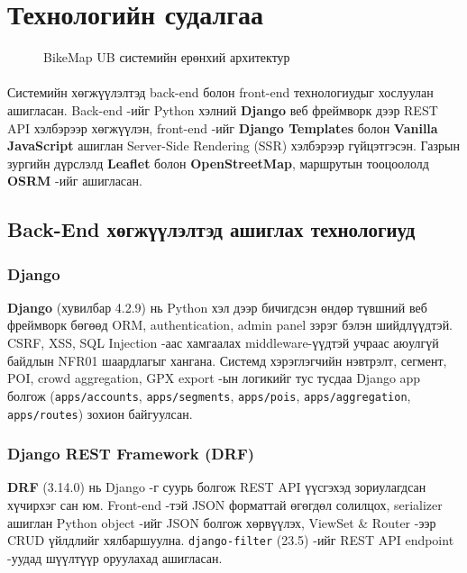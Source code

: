 \section{Технологийн судалгаа}
\begin{figure}[H]
    \centering
    \caption{BikeMap UB системийн ерөнхий архитектур}
    \label{fig:system-architecture}
\end{figure}
\paragraph{}
Системийн хөгжүүлэлтэд back-end болон front-end технологиудыг хослуулан ашигласан. Back-end -ийг Python хэлний \textbf{Django} веб фреймворк дээр REST API хэлбэрээр хөгжүүлэн, front-end -ийг \textbf{Django Templates} болон \textbf{Vanilla JavaScript} ашиглан Server-Side Rendering (SSR) хэлбэрээр гүйцэтгэсэн. Газрын зургийн дүрслэлд \textbf{Leaflet} болон \textbf{OpenStreetMap}, маршрутын тооцоололд \textbf{OSRM} -ийг ашигласан.
\subsection{Back-End хөгжүүлэлтэд ашиглах технологиуд}

\subsubsection{Django}
\textbf{Django} (хувилбар 4.2.9) нь Python хэл дээр бичигдсэн өндөр түвшний веб фреймворк бөгөөд ORM, authentication, admin panel зэрэг бэлэн шийдлүүдтэй. CSRF, XSS, SQL Injection -аас хамгаалах middleware-үүдтэй учраас аюулгүй байдлын NFR01 шаардлагыг хангана. Системд хэрэглэгчийн нэвтрэлт, сегмент, POI, crowd aggregation, GPX export -ын логикийг тус тусдаа Django app болгож (\texttt{apps/accounts}, \texttt{apps/segments}, \texttt{apps/pois}, \texttt{apps/aggregation}, \texttt{apps/routes}) зохион байгуулсан.

\subsubsection{Django REST Framework (DRF)}
\textbf{DRF} (3.14.0) нь Django -г суурь болгож REST API үүсгэхэд зориулагдсан хүчирхэг сан юм. Front-end -тэй JSON форматтай өгөгдөл солилцох, serializer ашиглан Python object -ийг JSON болгож хөрвүүлэх, ViewSet \& Router -ээр CRUD үйлдлийг хялбаршуулна. \texttt{django-filter} (23.5) -ийг REST API endpoint -уудад шүүлтүүр оруулахад ашигласан.

